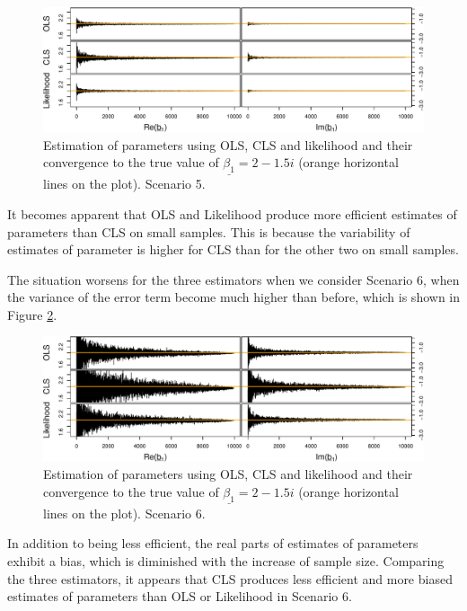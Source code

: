 \documentclass[
]{book}
\begin{document}
\begin{figure}
\centering
\includegraphics{Svetunkov---Svetunkov---Complex-Valued-Econometrics_files/figure-latex/parametersCorError-1.pdf}
\caption{\label{fig:parametersCorError}Estimation of parameters using OLS, CLS and likelihood and their convergence to the true value of \(\underline{\beta_1}=2-1.5i\) (orange horizontal lines on the plot). Scenario 5.}
\end{figure}

It becomes apparent that OLS and Likelihood produce more efficient estimates of parameters than CLS on small samples. This is because the variability of estimates of parameter is higher for CLS than for the other two on small samples.

The situation worsens for the three estimators when we consider Scenario 6, when the variance of the error term become much higher than before, which is shown in Figure \ref{fig:parametersHVError}.

\begin{figure}
\centering
\includegraphics{Svetunkov---Svetunkov---Complex-Valued-Econometrics_files/figure-latex/parametersHVError-1.pdf}
\caption{\label{fig:parametersHVError}Estimation of parameters using OLS, CLS and likelihood and their convergence to the true value of \(\underline{\beta_1}=2-1.5i\) (orange horizontal lines on the plot). Scenario 6.}
\end{figure}

In addition to being less efficient, the real parts of estimates of parameters exhibit a bias, which is diminished with the increase of sample size. Comparing the three estimators, it appears that CLS produces less efficient and more biased estimates of parameters than OLS or Likelihood in Scenario 6.
\end{document}
